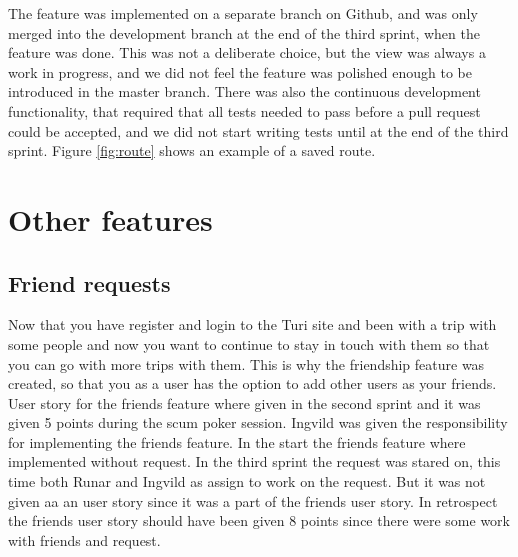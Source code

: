 \documentclass[a4paper]{article}
\begin{document}
\noindent
The feature was implemented on a separate branch on Github, and was only merged into the development branch at the end of the third sprint, when the feature was done. This was not a deliberate choice, but the view was always a work in progress, and we did not feel the feature was polished enough to be introduced in the master branch. There was also the continuous development functionality, that required that all tests needed to pass before a pull request could be accepted, and we did not start writing tests until at the end of the third sprint. Figure \ref{fig:route} shows an example of a saved route. \\

\section{Other features}
\subsection{Friend requests}
Now that you have register and login to the Turi site and been with a trip with some people and now you want to continue to stay in touch with them so that you can go with more trips with them. This is why the friendship feature was created, so that you as a user has the option to add other users as your friends. \\

\noindent
User story for the friends feature where given in the second sprint and it was given 5 points during the scum poker session. Ingvild was given the responsibility for implementing the friends feature. In the start the friends feature where implemented without request. In the third sprint the request was stared on, this time both Runar and Ingvild as assign to work on the request. But it was not given aa an user story since it was a part of the friends user story. In retrospect the friends user story should have been given 8 points since there were some work with friends and request. \\
\end{document}

